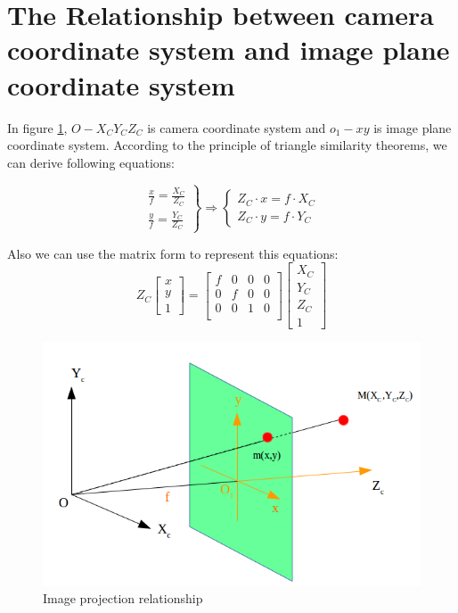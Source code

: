 \section{The Relationship between camera coordinate system and image plane coordinate system}
\label{subsec:ccs_ics}

In figure \ref{fig:ccs}, $O-X_CY_CZ_C$ is camera coordinate system and $o_1-xy$ is image plane coordinate system. According to the principle of triangle similarity theorems, we can derive following equations:

\begin{equation}\label{eq:erl5}
 \left.\begin{aligned}
        \frac{x}{f}=\frac{X_C}{Z_C}\\
        \frac{y}{f}=\frac{Y_C}{Z_C}
       \end{aligned}
 \right\} \Rightarrow
  \text{}
   \left\{\begin{aligned}
        Z_C \cdot x=f \cdot X_C\\
        Z_C \cdot y=f \cdot Y_C
       \end{aligned}
 \right.
  \text{}
\end{equation}

Also we can use the matrix form to represent this equations:
\begin{equation}\label{eq:erl6}
Z_C \begin{bmatrix} x \\ y \\ 1 \end{bmatrix}
      = \begin{bmatrix} f & 0 & 0 & 0 \\
                        0 & f & 0 & 0 \\
                        0 & 0 & 1 & 0 \\ \end{bmatrix}
        \begin{bmatrix} X_C \\ Y_C \\ Z_C \\ 1 \end{bmatrix}                 
\end{equation}

\begin{figure}[h]
\centering
\includegraphics[scale=0.5]{./fig/ccs.png}
\caption{Image projection relationship}
\label{fig:ccs}
\end{figure}

